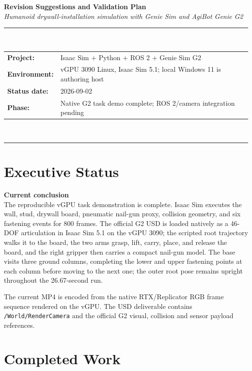 \documentclass[11pt,a4paper]{article}
\newenvironment{statusbox}[1]{%
  \begin{mdframed}[backgroundcolor=lightgray,linecolor=borderblue,linewidth=1.2pt,
                   innertopmargin=6pt,innerbottommargin=6pt,
                   innerleftmargin=10pt,innerrightmargin=10pt]
  \textbf{\color{sectionblue}#1}\\[4pt]
}{%
  \end{mdframed}
}
\begin{document}
\begin{center}
  {\LARGE\bfseries Revision Suggestions and Validation Plan}\\[6pt]
  {\large\itshape Humanoid drywall-installation simulation with Genie Sim and AgiBot Genie G2}\\[10pt]
  \rule{\linewidth}{1pt}\\[4pt]
  \begin{tabular}{ll}
    \textbf{Project:} & Isaac Sim + Python + ROS 2 + Genie Sim G2 \\
    \textbf{Environment:} & vGPU 3090 Linux, Isaac Sim 5.1; local Windows 11 is authoring host \\
    \textbf{Status date:} & 2026-09-02 \\
    \textbf{Phase:} & Native G2 task demo complete; ROS 2/camera integration pending \\
  \end{tabular}\\[4pt]
  \rule{\linewidth}{1pt}
\end{center}

\section{Executive Status}

\begin{statusbox}{Current conclusion}
The reproducible vGPU task demonstration is complete. Isaac Sim executes the wall,
stud, drywall board, pneumatic nail-gun proxy, collision geometry, and six fastening
events for 800 frames. The official G2 USD is loaded natively as a 46-DOF articulation
in Isaac Sim 5.1 on the vGPU 3090; the scripted root trajectory walks it to the board,
the two arms grasp, lift, carry, place, and release the board, and the right gripper
then carries a compact nail-gun model. The base visits three ground columns, completing
the lower and upper fastening points at each column before moving to the next one; the
outer root pose remains upright throughout the 26.67-second run.
\end{statusbox}

The current MP4 is encoded from the native RTX/Replicator RGB frame sequence rendered
on the vGPU. The USD deliverable contains \texttt{/World/RenderCamera} and the official
G2 visual, collision and sensor payload references.

\section{Completed Work}
\end{document}
